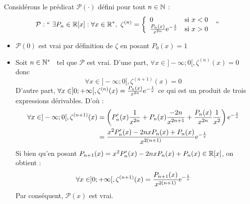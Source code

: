 \documentclass{article}
\renewenvironment{question_kholle}[2][ ]
{
	\subsection{\texorpdfstring{#2}{}}
	\notblank{#1}
	{
		\noindent #1
		\bigbreak
	}
	{}
	\begin{proof}
}
{
	\end{proof}
}
\begin{document}
\begin{question_kholle}
		Considérons le prédicat $\mathcal{P}(\cdot)$ défini pour tout $n \in \mathbb N$ :
		\begin{equation}
			\mathcal{P} : \text{\textquotedblleft} \ \exists P_n \in \R[x] : \forall x \in \R^*, \ \zeta^{(n)} = \left\{ \begin{array}{lc}
				0 &\text{si } x < 0 \\
				\frac{P_n(x)}{x^{2n}} \e^{-\frac{1}{x}} &\text{si } x > 0
			\end{array} \right. \ \text{\textquotedblright}
		\end{equation}
		\begin{itemize}[label=$\star$]
			\item $\mathcal{P}(0)$ est vrai par définition de $\zeta$ en posant $P_0(x) = 1$
			\item Soit $n \in \mathbb N^*$ \fq \ tel que $\mathcal{P}$ est vrai.
			D'une part, $\forall x \in ]-\infty;0[, \zeta^{(n)}(x) = 0$ donc
			\begin{equation*}
				\forall x \in ]-\infty;0[, \zeta^{(n+1)}(x) = 0
			\end{equation*}
			D'autre part, $\forall x \in ]0;+\infty[, \zeta^{(n)}(x) = \frac{P_n(x)}{x^{2n}} \mathrm e^{-\frac{1}{x}}$ ce qui est un produit de trois expressions dérivables. D'où :
			\begin{equation*}
				\begin{aligned}
					\forall x \in ]-\infty;0[,
					\zeta^{(n+1)}(x)
					&= \left( P_n'(x) \frac{1}{x^{2n}} + P_n(x) \frac{-2n}{x^{2n+1}} + \frac{P_n(x)}{x^{2n}} \frac{1}{x^2} \right) \mathrm e^{-\frac{1}{x}} \\
					&= \frac{x^2 P_n'(x) - 2nxP_n(x) + P_n(x)}{x^{2(n+1)}} \mathrm e^{-\frac{1}{x}}
				\end{aligned}
			\end{equation*}
			Si bien qu'en posant $P_{n+1}(x) = x^2 P_n'(x) - 2 n x P_n(x) + P_n(x) \in \mathbb R[x]$, on obtient :
			\begin{equation*}
				\forall x \in ]0;+\infty[, \zeta^{(n+1)}(x) = \frac{P_{n+1}(x)}{x^{2(n+1)}} \mathrm e^{-\frac{1}{x}}
			\end{equation*}
			Par conséquent, $\mathcal{P}(x)$ est vrai.


\end{itemize}
\end{question_kholle}
\end{document}
